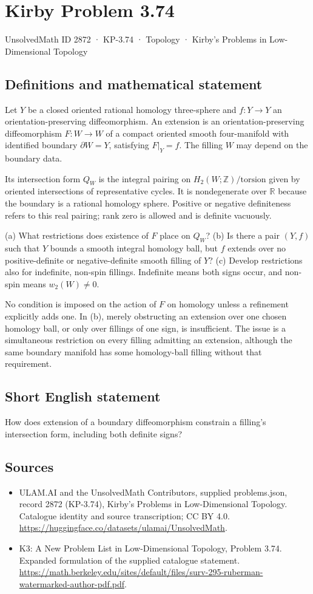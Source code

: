 \documentclass[11pt,a4paper]{article}
\begin{document}
\section*{Kirby Problem 3.74}\label{2872}
{\small UnsolvedMath ID 2872 · KP-3.74 · Topology · Kirby's Problems in Low-Dimensional Topology}
\subsection{Definitions and mathematical statement}
Let $Y$ be a closed oriented rational homology three-sphere and $f:Y\to Y$ an orientation-preserving diffeomorphism. An extension is an orientation-preserving diffeomorphism $F:W\to W$ of a compact oriented smooth four-manifold with identified boundary $\partial W=Y$, satisfying $F|_Y=f$. The filling $W$ may depend on the boundary data.

Its intersection form $Q_W$ is the integral pairing on $H_2(W;\mathbb Z)/\mathrm{torsion}$ given by oriented intersections of representative cycles. It is nondegenerate over $\mathbb R$ because the boundary is a rational homology sphere. Positive or negative definiteness refers to this real pairing; rank zero is allowed and is definite vacuously.

(a) What restrictions does existence of $F$ place on $Q_W$? (b) Is there a pair $(Y,f)$ such that $Y$ bounds a smooth integral homology ball, but $f$ extends over no positive-definite or negative-definite smooth filling of $Y$? (c) Develop restrictions also for indefinite, non-spin fillings. Indefinite means both signs occur, and non-spin means $w_2(W)\ne0$.

No condition is imposed on the action of $F$ on homology unless a refinement explicitly adds one. In (b), merely obstructing an extension over one chosen homology ball, or only over fillings of one sign, is insufficient. The issue is a simultaneous restriction on every filling admitting an extension, although the same boundary manifold has some homology-ball filling without that requirement.
\subsection{Short English statement}
How does extension of a boundary diffeomorphism constrain a filling's intersection form, including both definite signs?
\subsection{Sources}
\begin{itemize}
\item[S1] ULAM.AI and the UnsolvedMath Contributors, supplied problems.json, record 2872 (KP-3.74), Kirby's Problems in Low-Dimensional Topology. Catalogue identity and source transcription; CC BY 4.0.
\url{https://huggingface.co/datasets/ulamai/UnsolvedMath}.
\item[S2] K3: A New Problem List in Low-Dimensional Topology, Problem 3.74. Expanded formulation of the supplied catalogue statement.
\url{https://math.berkeley.edu/sites/default/files/surv-295-ruberman-watermarked-author-pdf.pdf}.
\end{itemize}
\end{document}
